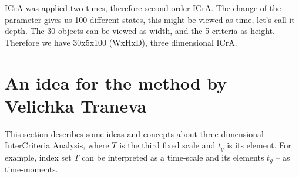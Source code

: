 \documentclass[12pt, a4paper]{article}
\begin{document}
ICrA was applied two times, therefore second order ICrA.
The change of the parameter gives us 100 different states,
this might be viewed as time, let's call it depth.
The 30 objects can be viewed as width, and the 5 criteria as height.
Therefore we have 30x5x100 (WxHxD), three dimensional ICrA.



\section{An idea for the method by Velichka Traneva}

This section describes some ideas and concepts about three dimensional InterCriteria Analysis, where $T$ is the third fixed scale and $t_g$ is its element. For example, index set $T$ can be interpreted as a time-scale and its elements $t_g$ -- as time-moments.
\end{document}
